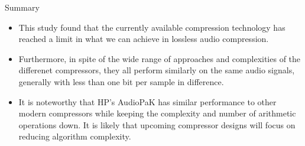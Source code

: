 \documentclass{beamer}
\begin{document}
\begin{frame}{Summary}
  \begin{itemize}
  \item
    This study found that the \alert{currently available compression technology} has \alert{reached a limit} in what we can achieve in \alert{lossless audio compression}.
  \item
    Furthermore, in spite of the \alert{wide range of approaches and complexities} of the differenet compressors, they all \alert{perform similarly} on the same audio signals, generally with less than one bit per sample in difference.
  \item
    It is noteworthy that HP's AudioPaK has similar performance to other modern compressors while keeping the complexity and number of arithmetic operations down. It is likely that upcoming compressor designs will focus on reducing algorithm complexity.
  \end{itemize}
  
\end{frame}
\end{document}
